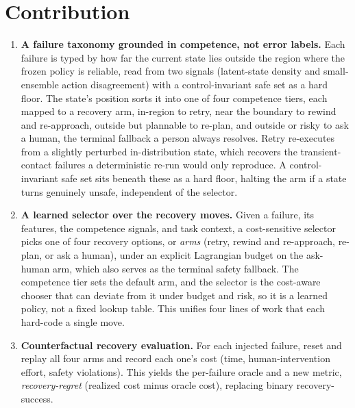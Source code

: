 \documentclass[11pt]{article}
\begin{document}
\section{Contribution}
\begin{enumerate}
\item \textbf{A failure taxonomy grounded in competence, not error labels.} Each failure is typed by how far the current state lies outside the region where the frozen policy is reliable, read from two signals (latent-state density and small-ensemble action disagreement) with a control-invariant safe set as a hard floor. The state's position sorts it into one of four competence tiers, each mapped to a recovery arm, in-region to retry, near the boundary to rewind and re-approach, outside but plannable to re-plan, and outside or risky to ask a human, the terminal fallback a person always resolves. Retry re-executes from a slightly perturbed in-distribution state, which recovers the transient-contact failures a deterministic re-run would only reproduce. A control-invariant safe set sits beneath these as a hard floor, halting the arm if a state turns genuinely unsafe, independent of the selector.
\item \textbf{A learned selector over the recovery moves.} Given a failure, its features, the competence signals, and task context, a cost-sensitive selector picks one of four recovery options, or \emph{arms} (retry, rewind and re-approach, re-plan, or ask a human), under an explicit Lagrangian budget on the ask-human arm, which also serves as the terminal safety fallback. The competence tier sets the default arm, and the selector is the cost-aware chooser that can deviate from it under budget and risk, so it is a learned policy, not a fixed lookup table. This unifies four lines of work that each hard-code a single move.
\item \textbf{Counterfactual recovery evaluation.} For each injected failure, reset and replay all four arms and record each one's cost (time, human-intervention effort, safety violations). This yields the per-failure oracle and a new metric, \emph{recovery-regret} (realized cost minus oracle cost), replacing binary recovery-success.
\end{enumerate}
\end{document}
